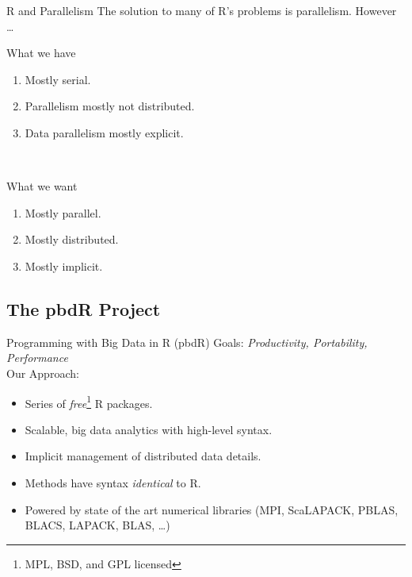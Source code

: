 \begin{frame}[shrink]
  \begin{block}{R and Parallelism}
    The solution to many of R's problems is parallelism.  However \dots\vspace{-.4cm}
   \begin{center}
    \begin{minipage}[t]{.95\textwidth}
    \begin{block}{\centering What we have}
      \begin{enumerate}[<+-|alert@+>]
	\item Mostly serial.
	\item Parallelism mostly not distributed.
	\item Data parallelism mostly explicit.
      \end{enumerate}
    \end{block}
    \end{minipage}
    \\\pause
    \begin{minipage}[t]{.95\textwidth}
    \begin{block}{\centering What we want}
      \begin{enumerate}[<+-|alert@+>]
        \item Mostly parallel.
        \item Mostly distributed.
        \item Mostly implicit.
      \end{enumerate}
    \end{block}
    \end{minipage}
    \end{center}
    \end{block}
\end{frame}


\subsection{The pbdR Project}

\begin{frame}[squeeze]
  \begin{block}{Programming with Big Data in R (pbdR)}\pause
  Goals:  \emph{Productivity, Portability, Performance}\\[.4cm]\pause
  Our Approach:
  \begin{itemize}[<+-|alert@+>]
    \item Series of \emph{free}\footnote{MPL, BSD, and GPL licensed} R packages.
    \item Scalable, big data analytics with high-level syntax.
    \item Implicit management of distributed data details.
    \item Methods have syntax \emph{identical} to R.
    \item Powered by state of the art numerical libraries (MPI, ScaLAPACK, PBLAS, BLACS, LAPACK, BLAS, \dots)
  \end{itemize}
  \end{block}
\end{frame}

